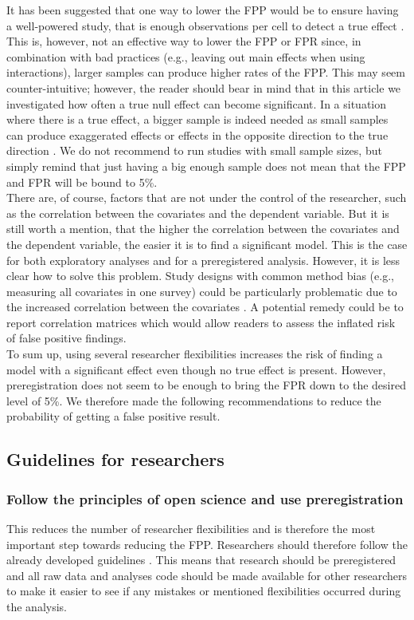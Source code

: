 It has been suggested that one way to lower the FPP would be to ensure having a well-powered study, that is enough observations per cell to detect a true effect \citep{Simmons2011, simmons2018}. This is, however, not an effective way to lower the FPP or FPR since, in combination with bad practices (e.g., leaving out main effects when using interactions), larger samples can produce higher rates of the FPP. This may seem counter-intuitive; however, the reader should bear in mind that in this article we investigated how often a true null effect can become significant. In a situation where there is a true effect, a bigger sample is indeed needed as small samples can produce exaggerated effects or effects in the opposite direction to the true direction \citep{gelman2014beyond}. We do not recommend to run studies with small sample sizes, but simply remind that just having a big enough sample does not mean that the FPP and FPR will be bound to 5\%.\\

There are, of course, factors that are not under the control of the researcher, such as the correlation between the covariates and the dependent variable. But it is still worth a mention, that the higher the correlation between the covariates and the dependent variable, the easier it is to find a significant model. This is the case for both exploratory analyses and for a preregistered analysis. However, it is less clear how to solve this problem. Study designs with common method bias (e.g., measuring all covariates in one survey) could be particularly problematic due to  the increased correlation between the covariates \citep{podsakoff2003}. A potential remedy could be to report correlation matrices which would allow readers to assess the inflated risk of false positive findings.  \\ 

To sum up, using several researcher flexibilities increases the risk of finding a model with a significant effect even though no true effect is present. However, preregistration does not seem to be enough to bring the FPR down to the desired level of 5\%. We therefore made the following recommendations to reduce the probability of getting a false positive result. 

\subsection{Guidelines for researchers}

\subsubsection{Follow the principles of open science and use preregistration}
This reduces the number of researcher flexibilities and is therefore the most important step towards reducing the FPP. Researchers should therefore follow the already developed guidelines \citep{Nosek2015}. This means that research should be preregistered and all raw data and analyses code should be made available for other researchers to make it easier to see if any mistakes or mentioned flexibilities occurred during the analysis. 
